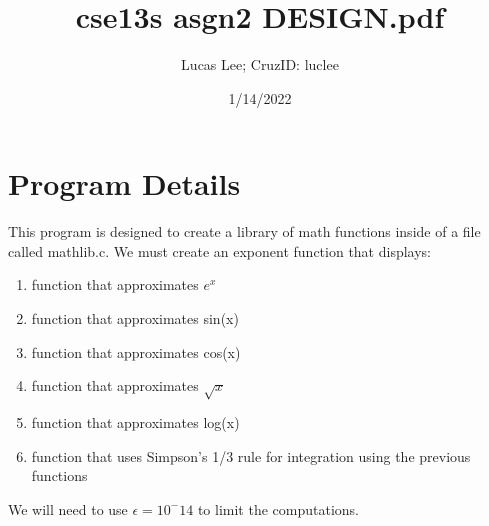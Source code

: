\documentclass[11pt]{article}
\title{cse13s asgn2 DESIGN.pdf}
\author{Lucas Lee; CruzID: luclee}
\date{1/14/2022}
\begin{document}
\maketitle

\section{Program Details}\label{ss:details}
This program is designed to create a library of math functions inside of a file called mathlib.c. We must create an exponent function that displays:
\begin{enumerate}
	\item function that approximates \(e^x\)
\item function that approximates sin(x)
\item function that approximates cos(x)
\item function that approximates $\sqrt{x}$
\item function that approximates log(x)
\item function that uses Simpson's 1/3 rule for integration using the previous functions
\end{enumerate}
We will need to use \(\epsilon = 10^-14\) to limit the computations.
\end{document}
